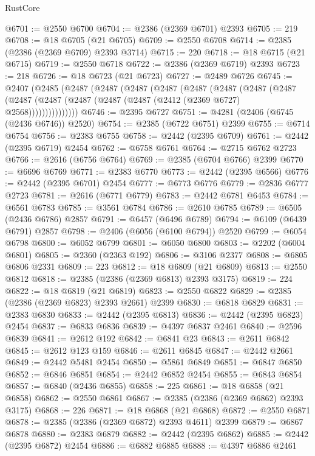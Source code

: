 \begin{lexlean}{RustCore}
\begin{coremodule}
@6701 := @2550 @6700
@6704 := @2386 (@2369 @6701) @2393
@6705 := 219
@6708 := @18 @6705 (@21 @6705)
@6709 := @2550 @6708
@6714 := @2385 (@2386 (@2369 @6709) @2393 @3714)
@6715 := 220
@6718 := @18 @6715 (@21 @6715)
@6719 := @2550 @6718
@6722 := @2386 (@2369 @6719) @2393
@6723 := 218
@6726 := @18 @6723 (@21 @6723)
@6727 := @2489 @6726
@6745 := @2407
    (@2485
      (@2487
        (@2487
          (@2487
            (@2487
              (@2487
                (@2487
                  (@2487
                    (@2487
                      (@2487 (@2487 (@2487 (@2487 (@2487 (@2412 (@2369 @6727) @2568)))))))))))))))
@6746 := @2395 @6727
@6751 := @4281 (@2406 (@6745 (@2436 @6746)) @2520)
@6754 := @2385 (@6722 @6751) @2399
@6755 := @6714 @6754
@6756 := @2383 @6755
@6758 := @2442 (@2395 @6709)
@6761 := @2442 (@2395 @6719) @2454
@6762 := @6758 @6761
@6764 := @2715 @6762 @2723
@6766 := @2616 (@6756 @6764)
@6769 := @2385 (@6704 @6766) @2399
@6770 := @6696 @6769
@6771 := @2383 @6770
@6773 := @2442 (@2395 @6566)
@6776 := @2442 (@2395 @6701) @2454
@6777 := @6773 @6776
@6779 := @2836 @6777 @2723
@6781 := @2616 (@6771 @6779)
@6783 := @2442 @6781 @6453
@6784 := @6561 @6783
@6785 := @3561 @6784
@6786 := @2610 @6785
@6789 := @6505 (@2436 @6786) @2857
@6791 := @6457 (@6496 @6789)
@6794 := @6109 (@6439 @6791) @2857
@6798 := @2406 (@6056 (@6100 @6794)) @2520
@6799 := @6054 @6798
@6800 := @6052 @6799
@6801 := @6050 @6800
@6803 := @2202 (@6004 @6801)
@6805 := @2360 (@2363 @192)
@6806 := @3106 @2377
@6808 := @6805 @6806 @2331
@6809 := 223
@6812 := @18 @6809 (@21 @6809)
@6813 := @2550 @6812
@6818 := @2385 (@2386 (@2369 @6813) @2393 @3175)
@6819 := 224
@6822 := @18 @6819 (@21 @6819)
@6823 := @2550 @6822
@6829 := @2385 (@2386 (@2369 @6823) @2393 @2661) @2399
@6830 := @6818 @6829
@6831 := @2383 @6830
@6833 := @2442 (@2395 @6813)
@6836 := @2442 (@2395 @6823) @2454
@6837 := @6833 @6836
@6839 := @4397 @6837 @2461
@6840 := @2596 @6839
@6841 := @2612 @192
@6842 := @6841 @23
@6843 := @2611 @6842
@6845 := @2612 @123 @159
@6846 := @2611 @6845
@6847 := @2442 @2661
@6849 := @2442 @5481 @2454
@6850 := @5861 @6849
@6851 := @6847 @6850
@6852 := @6846 @6851
@6854 := @2442 @6852 @2454
@6855 := @6843 @6854
@6857 := @6840 (@2436 @6855)
@6858 := 225
@6861 := @18 @6858 (@21 @6858)
@6862 := @2550 @6861
@6867 := @2385 (@2386 (@2369 @6862) @2393 @3175)
@6868 := 226
@6871 := @18 @6868 (@21 @6868)
@6872 := @2550 @6871
@6878 := @2385 (@2386 (@2369 @6872) @2393 @4611) @2399
@6879 := @6867 @6878
@6880 := @2383 @6879
@6882 := @2442 (@2395 @6862)
@6885 := @2442 (@2395 @6872) @2454
@6886 := @6882 @6885
@6888 := @4397 @6886 @2461

\end{coremodule}
\end{lexlean}
